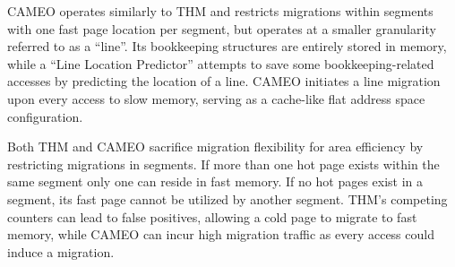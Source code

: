 CAMEO \cite{cameo} operates similarly to THM and restricts migrations within segments with one fast page location per segment, but operates at a smaller granularity referred to as a ``line''. Its bookkeeping structures are entirely stored in memory, while a ``Line Location Predictor'' attempts to save some bookkeeping-related accesses by predicting the location of a line. CAMEO initiates a line migration upon every access to slow memory, serving as a cache-like flat address space configuration.

Both THM and CAMEO sacrifice migration flexibility for area efficiency by restricting migrations in segments. If more than one hot page exists within the same segment only one can reside in fast memory. If no hot pages exist in a segment, its fast page cannot be utilized by another segment. THM's competing counters can lead to false positives, allowing a cold page to migrate to fast memory, while CAMEO can incur high migration traffic as every access could induce a
migration.
